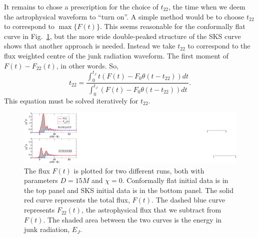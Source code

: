 \documentclass[aps,prd,amsmath,floatfix,twocolumn,superscriptaddress,nofootinbib,showpacs]{revtex4-1}
\theoremstyle{plain}
\theoremstyle{definition}
\begin{document}
It remains to chose a prescription for the choice of $t_{22}$, the
time when we deem the astrophysical waveform to ``turn on''.
A simple method would be to choose
$t_{22}$ to correspond to $\max\{F(t)\}$. This seems reasonable for
the conformally flat curve in Fig.~\ref{fig:FluxSample}, but the
more wide double-peaked structure of the SKS curve shows that another
approach is needed. Instead we take $t_{22}$ to correspond to the flux
weighted centre of the junk radiation waveform. The first moment of
$F(t)-F_{22}(t)$, in other words. So,
\begin{equation}\label{eq:t22}
t_{22}=\frac{\int_0^{t_J}{t(F(t)-F_0\theta(t-t_{22}))dt}}{\int_0^{t_J}{(F(t)-F_0\theta(t-t_{22}))dt}}.
\end{equation}
This equation must be solved iteratively for $t_{22}$.

\begin{figure}
 \includegraphics[scale=0.55]{FluxSample}
  \caption{The flux $F(t)$ is plotted for two different runs, both
    with parameters $D=15M$ and $\chi=0$. Conformally flat initial
    data is in the top panel and SKS initial data is in the bottom
    panel. The solid red curve represents the total flux, $F(t)$. The
    dashed blue curve represents $F_{22}(t)$, the astrophysical flux
    that we subtract from $F(t)$. The shaded area between the two
    curves is the energy in junk radiation, $E_J$.
}
  \label{fig:FluxSample}
\end{figure}
\end{document}
